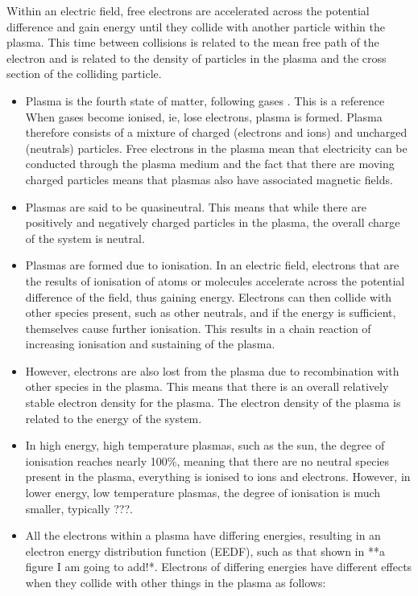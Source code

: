 \documentclass[11pt, oneside]{article}   	%
\begin{document}
Within an electric field, free electrons are accelerated across the potential difference and gain energy until they collide with another particle within the plasma.
This time between collisions is related to the mean free path of the electron and is related to the density of particles in the plasma and the cross section of the colliding particle.

\begin{itemize}
\item Plasma is the fourth state of matter, following gases \cite{Graves2012}. This is a reference \cite{Attri2015} When gases become ionised, ie, lose electrons, plasma is formed. Plasma therefore consists of a mixture of charged (electrons and ions) and uncharged (neutrals) particles. Free electrons in the plasma mean that electricity can be conducted through the plasma medium and the fact that there are moving charged particles means that plasmas also have associated magnetic fields.
\item Plasmas are said to be quasineutral. This means that while there are positively and negatively charged particles in the plasma, the overall charge of the system is neutral.
\item Plasmas are formed due to ionisation. In an electric field, electrons that are the results of ionisation of atoms or molecules accelerate across the potential difference of the field, thus gaining energy.
Electrons can then collide with other species present, such as other neutrals, and if the energy is sufficient, themselves cause further ionisation.
This results in a chain reaction of increasing ionisation and sustaining of the plasma.
\item However, electrons are also lost from the plasma due to recombination with other species in the plasma.
This means that there is an overall relatively stable electron density for the plasma. 
The electron density of the plasma is related to the energy of the system.
\item In high energy, high temperature plasmas, such as the sun, the degree of ionisation reaches nearly 100\%, meaning that there are no neutral species present in the plasma, everything is ionised to ions and electrons. 
However, in lower energy, low temperature plasmas, the degree of ionisation is much smaller, typically ???.
\item All the electrons within a plasma have differing energies, resulting in an electron energy distribution function (EEDF), such as that shown in **a figure I am going to add!*. Electrons of differing energies have different effects when they collide with other things in the plasma as follows:

\end{itemize}
\end{document}
